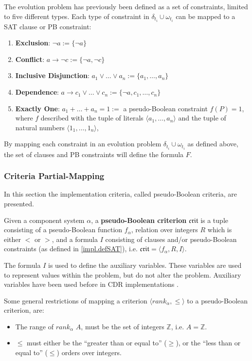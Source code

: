 The evolution problem has previously been defined as a set of constraints, limited to five different types.
Each type of constraint in $\delta_{t_i} \cup \omega_{t_i}$ can be mapped to a SAT clause or PB constraint:
\begin{enumerate}
  \item \textbf{Exclusion}: $\neg a := \{\neg a\}$
  \item \textbf{Conflict}: $a \rightarrow \neg c := \{\neg a, \neg c\}$ 
  \item \textbf{Inclusive Disjunction}: $a_1 \vee \ldots \vee a_n := \{a_1, \ldots,  a_n\}$ 
  \item \textbf{Dependence}: $a \rightarrow c_1 \vee \ldots \vee c_n := \{\neg a, c_1, \ldots, c_n\}$
  \item \textbf{Exactly One}: $a_1 + \ldots + a_n = 1 := $ a pseudo-Boolean constraint $f(P) = 1$, 
  where $f$ described with the tuple of literals $\langle a_1 ,\ldots , a_n\rangle$ and the tuple of natural numbers $\langle 1_1,\ldots,1_n \rangle$,
\end{enumerate}
By mapping each constraint in an evolution problem $\delta_{t_i} \cup \omega_{t_i}$ as defined above, the set of clauses and PB constraints will define the formula $F$.

\subsubsection{Criteria Partial-Mapping}
In this section the implementation criteria, called pseudo-Boolean criteria, are presented.

\begin{defs}
Given a component system $\alpha$, a \textbf{pseudo-Boolean criterion} $\mathfrak{crit}$ is a tuple consisting of a pseudo-Boolean function $f_{\alpha}$,
relation over integers $R$ which is either $<$ or $>$, and a formula $I$ consisting of clauses and/or pseudo-Boolean constraints (as defined in \ref{impl.defSAT}),
i.e. $\mathfrak{crit} = \langle f_{\alpha}, R , I \rangle$.
\end{defs}
The formula $I$ is used to define the auxiliary variables.
These variables are used to represent values within the problem, but do not alter the problem.
Auxiliary variables have been used before in CDR implementations \citep{argelich2010solving}.

Some general restrictions of mapping a criterion $\langle rank_{\alpha},\leq \rangle$ to a pseudo-Boolean criterion, are:
\begin{itemize}
  \item The range of $rank_{\alpha}$ $A$, must be the set of integers $\mathbb{Z}$, i.e. $A = \mathbb{Z}$.
  \item $\leq$ must either be the ``greater than or equal to'' ($\geq$), or the ``less than or equal to'' ($\leq$) orders over integers.
\end{itemize} 

